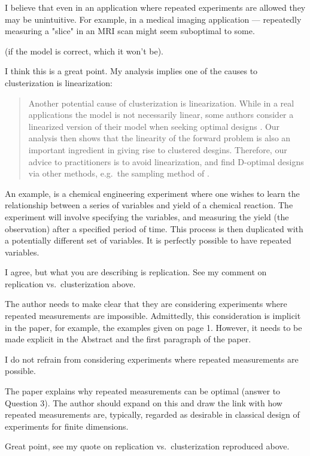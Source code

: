 \AR I believe that even in an application where repeated experiments
are allowed they may be unintuitive. For example, in a medical imaging
application --- repeatedly measuring a "slice" in an MRI scan might
seem suboptimal to some.


\RC (if the model is correct, which it won’t be).

\AR I think this is a great point. My analysis implies one of the
causes to clusterization is linearization:
\begin{quote} %
Another potential cause of clusterization is linearization. While in a
real applications the model is not necessarily linear, some authors
consider a linearized version of their model when seeking optimal
designs \cite{fedorov1996, neitzel2019sparse}. Our analysis then shows
that the linearity of the forward problem is also an important
ingredient in giving rise to clustered desgins. Therefore, our advice
to practitioners is to avoid linearization, and find D-optimal designs
via other methods, e.g.~the sampling method of \cite{ryan2003}.
\end{quote}


\RC An example, is a chemical engineering experiment where one wishes
to learn the relationship between a series of variables and yield of a
chemical reaction. The experiment will involve specifying the
variables, and measuring the yield (the observation) after a specified
period of time. This process is then duplicated with a potentially
different set of variables. It is perfectly possible to have repeated
variables.

\AR I agree, but what you are describing is replication. See my
comment on replication vs.~clusterization above.
 
\RC The author needs to make clear that they are considering
experiments where repeated measurements are impossible. Admittedly,
this consideration is implicit in the paper, for example, the examples
given on page 1. However, it needs to be made explicit in the Abstract
and the first paragraph of the paper.

\AR I do not refrain from considering experiments where repeated
measurements are possible.

  
\RC The paper explains why repeated measurements can be optimal
(answer to Question 3). The author should expand on this and draw the
link with how repeated measurements are, typically, regarded as
desirable in classical design of experiments for finite
dimensions.

\AR Great point, see my quote on replication vs.~clusterization
reproduced above.

